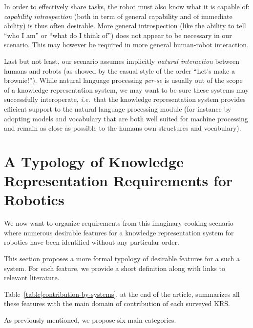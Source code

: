 \documentclass[a4paper, twocolumn]{article}
\newcommand{\ie}{{\textit{i.e.\ }}}
\begin{document}
In order to effectively share tasks, the robot must also know what it is
capable of: \emph{capability introspection} (both in term of general capability
and of immediate ability) is thus often desirable. More general introspection
(like the ability to tell ``who I am'' or ``what do I think of'') does not
appear to be necessary in our scenario. This may however be required in more
general human-robot interaction.

Last but not least, our scenario assumes implicitly \emph{natural interaction}
between humans and robots (as showed by the casual style of the
order ``Let's make a brownie!''). While natural language processing {\it
per-se} is usually out of the scope of a knowledge representation system, we
may want to be sure these systems may successfully interoperate, \ie that the
knowledge representation system provides efficient support to the natural
language processing module (for instance by adopting models and vocabulary that
are both well suited for machine processing and remain as close as possible to
the humans own structures and vocabulary).

\section{A Typology of Knowledge Representation Requirements for Robotics}
\label{sect|features}

We now want to organize requirements from this imaginary cooking scenario where
numerous desirable features for a knowledge representation system for robotics
have been identified without any particular order.

This section proposes a more formal typology of desirable features for a such a
system. For each feature, we provide a short definition along with links to
relevant literature.

Table~\ref{table|contribution-by-systems}, at the end of the article,
summarizes all these features with the main domain of contribution of each
surveyed KRS.

As previously mentioned, we propose six main categories.

\begin{scriptsize}
\begin{center}
\end{center}
\end{scriptsize}
\end{document}
